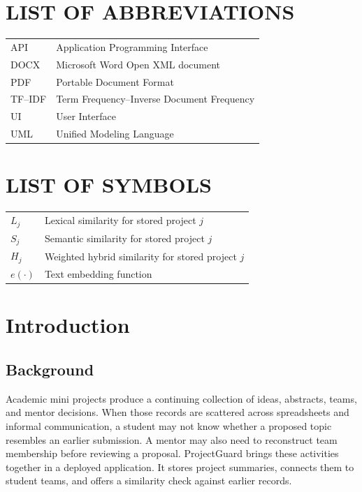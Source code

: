\documentclass[12pt,a4paper]{report}
\begin{document}
\chapter*{LIST OF ABBREVIATIONS}
\begin{tabular}{ll}API & Application Programming Interface\\ DOCX & Microsoft Word Open XML document\\ PDF & Portable Document Format\\ TF--IDF & Term Frequency--Inverse Document Frequency\\ UI & User Interface\\ UML & Unified Modeling Language\end{tabular}\clearpage
\tableofcontents\clearpage
\listoffigures{}\clearpage
\listoftables{}\clearpage
\chapter*{LIST OF SYMBOLS}
\begin{tabular}{ll}$L_j$ & Lexical similarity for stored project $j$\\ $S_j$ & Semantic similarity for stored project $j$\\ $H_j$ & Weighted hybrid similarity for stored project $j$\\ $e(\cdot)$ & Text embedding function\end{tabular}\clearpage
{}
\chapter{Introduction}
\section{Background}
Academic mini projects produce a continuing collection of ideas, abstracts, teams, and mentor decisions. When those records are scattered across spreadsheets and informal communication, a student may not know whether a proposed topic resembles an earlier submission. A mentor may also need to reconstruct team membership before reviewing a proposal. ProjectGuard brings these activities together in a deployed application. It stores project summaries, connects them to student teams, and offers a similarity check against earlier records.
\end{document}
